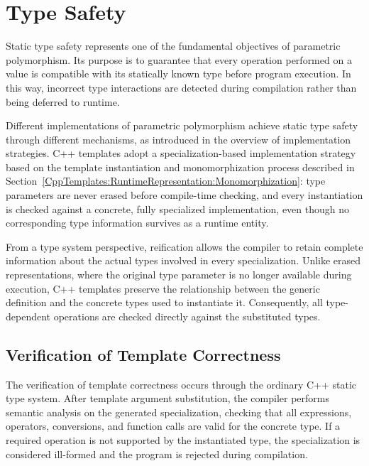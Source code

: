 \documentclass[11pt]{report}
\begin{document}

\section{Type Safety}
\label{CppTemplates:TypeSafety}
Static type safety represents one of the fundamental objectives of
parametric polymorphism. Its purpose is to guarantee that every operation
performed on a value is compatible with its statically known type before
program execution. In this way, incorrect type interactions are detected
during compilation rather than being deferred to runtime.

Different implementations of parametric polymorphism achieve static type
safety through different mechanisms, as introduced in the overview of
implementation strategies. C++ templates adopt a specialization-based implementation strategy based on
the template instantiation and monomorphization process described in
Section~\ref{CppTemplates:RuntimeRepresentation:Monomorphization}: type parameters are never erased before
compile-time checking, and every instantiation is checked against a concrete,
fully specialized implementation, even though no corresponding type
information survives as a runtime entity.

From a type system perspective, reification allows the compiler to retain
complete information about the actual types involved in every specialization.
Unlike erased representations, where the original type parameter is no
longer available during execution, C++ templates preserve the relationship
between the generic definition and the concrete types used to instantiate it.
Consequently, all type-dependent operations are checked directly against the
substituted types.

\subsection{Verification of Template Correctness}

The verification of template correctness occurs through the ordinary C++
static type system. After template argument substitution, the compiler
performs semantic analysis on the generated specialization, checking that
all expressions, operators, conversions, and function calls are valid for
the concrete type. If a required operation is not supported by the
instantiated type, the specialization is considered ill-formed and the
program is rejected during compilation.
\end{document}
